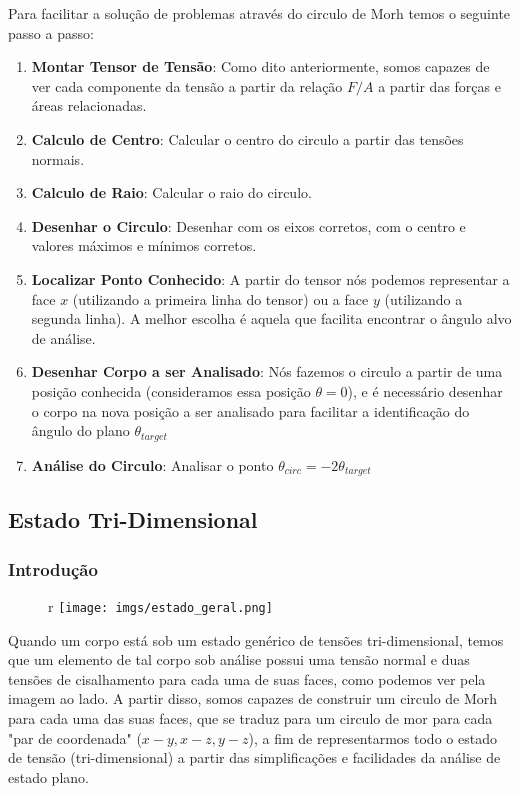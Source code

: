 \documentclass{article}
\begin{document}
\newpage
Para facilitar a solução de problemas através do circulo de Morh temos o seguinte passo a passo:
\begin{enumerate}
    \item \textbf{Montar Tensor de Tensão}: Como dito anteriormente, somos capazes de ver cada componente da tensão a partir da relação $F/A$ a partir das forças e áreas relacionadas.
    \item \textbf{Calculo de Centro}: Calcular o centro do circulo a partir das tensões normais.
    \item \textbf{Calculo de Raio}: Calcular o raio do circulo.
    \item \textbf{Desenhar o Circulo}: Desenhar com os eixos corretos, com o centro e valores máximos e mínimos corretos.
    \item \textbf{Localizar Ponto Conhecido}: A partir do tensor nós podemos representar a face $x$ (utilizando a primeira linha do tensor) ou a face $y$ (utilizando a segunda linha). A melhor escolha é aquela que facilita encontrar o ângulo alvo de análise.
    \item \textbf{Desenhar Corpo a ser Analisado}: Nós fazemos o circulo a partir de uma posição conhecida (consideramos essa posição $\theta=0$), e é necessário desenhar o corpo na nova posição a ser analisado para facilitar a identificação do ângulo do plano $\theta_{target}$
    \item \textbf{Análise do Circulo}: Analisar o ponto $\theta_{circ} = -2 \theta_{target}$
\end{enumerate}

\newpage
\subsection{Estado Tri-Dimensional}
\subsubsection{Introdução}
 \begin{figure}[7]{r}
    \centering
    \texttt{[image: imgs/estado\_geral.png]}
\end{figure}
Quando um corpo está sob um estado genérico de tensões tri-dimensional, temos que um elemento de tal corpo sob análise possui uma tensão normal e duas tensões de cisalhamento para cada uma de suas faces, como podemos ver pela imagem ao lado. A partir disso, somos capazes de construir um circulo de Morh para cada uma das suas faces, que se traduz para um circulo de mor para cada "par de coordenada" ($x-y, x-z, y-z$), a fim de representarmos todo o estado de tensão (tri-dimensional) a partir das simplificações e facilidades da análise de estado plano.
\end{document}
